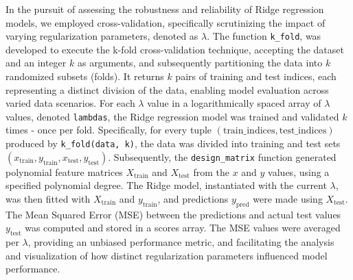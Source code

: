In the pursuit of assessing the robustness and reliability of Ridge regression models, we employed cross-validation, specifically scrutinizing the impact of varying regularization parameters, denoted as \(\lambda\). The function \texttt{k\_fold}, was developed to execute the k-fold cross-validation technique, accepting the dataset and an integer \(k\) as arguments, and subsequently partitioning the data into \(k\) randomized subsets (folds). It returns \(k\) pairs of training and test indices, each representing a distinct division of the data, enabling model evaluation across varied data scenarios.
For each \(\lambda\) value in a logarithmically spaced array of \(\lambda\) values, denoted \texttt{lambdas}, the Ridge regression model was trained and validated \(k\) times - once per fold. Specifically, for every tuple \((\text{train\_indices}, \text{test\_indices})\) produced by \texttt{k\_fold(data, k)}, the data was divided into training and test sets \((x_{\text{train}}, y_{\text{train}}, x_{\text{test}}, y_{\text{test}})\).
Subsequently, the \texttt{design\_matrix} function generated polynomial feature matrices \(X_{\text{train}}\) and \(X_{\text{test}}\) from the \(x\) and \(y\) values, using a specified polynomial degree. The Ridge model, instantiated with the current \(\lambda\), was then fitted with \(X_{\text{train}}\) and \(y_{\text{train}}\), and predictions \(y_{\text{pred}}\) were made using \(X_{\text{test}}\). The Mean Squared Error (MSE) between the predictions and actual test values \(y_{\text{test}}\) was computed and stored in a scores array.
The MSE values were averaged per \(\lambda\), providing an unbiased performance metric, and facilitating the analysis and visualization of how distinct regularization parameters influenced model performance.
